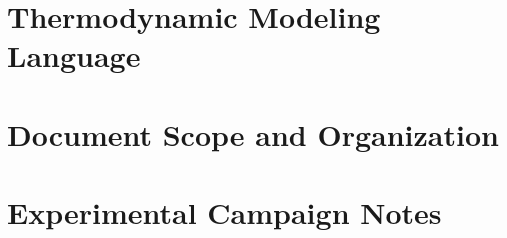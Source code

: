 \section{Thermodynamic Modeling Language}
\label{vol1:sec:intro:ontology}


\section{Document Scope and Organization}
\label{vol1:sec:intro:scope}


\section{Experimental Campaign Notes}
\label{vol1:sec:intro:notes}


